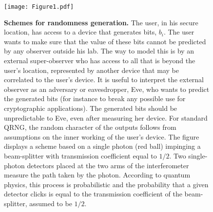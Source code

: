 \documentclass[11pt,a4paper]{article}
\begin{document}
{\newpage


\begin{figure}
\centering
\texttt{[image: Figure1.pdf]}
\caption{\textbf{Schemes for randomness generation.} The user, in
his secure location, has access to a device that generates bits,
$b_i$. The user wants to make sure that the value of these bits cannot
be predicted by any observer outside his lab. The way to model
this is by an external super-observer who has access to all that is
beyond the user's location, represented by another device that may
be correlated to the user's device. It is useful to
interpret the external observer as an adversary or eavesdropper,
Eve, who wants to predict the generated bits (for instance to
break any possible use for cryptographic applications). The
generated bits should be unpredictable to Eve, even after
measuring her device. For standard QRNG, the random character of
the outputs follows from assumptions on the inner working of the
user's device. The figure displays a scheme based on a single
photon (red ball) impinging a beam-splitter with transmission coefficient
equal to $1/2$. Two single-photon detectors placed at the two arms
of the interferometer measure the path taken by the photon.
According to quantum physics, this process is probabilistic and
the probability that a given detector clicks is equal to the
transmission coefficient of the beam-splitter, assumed to be
$1/2$.} \label{fig1}
\end{figure}


}
\end{document}
